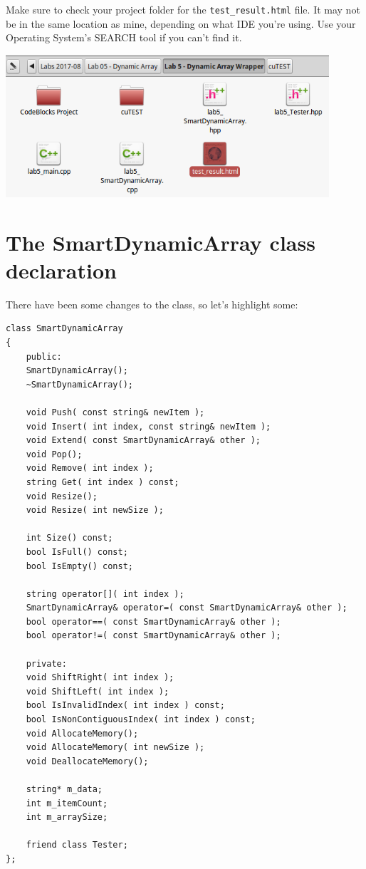\documentclass[a4paper,12pt]{book}
\begin{document}
        Make sure to check your project folder for the \texttt{test\_result.html} file.
        It may not be in the same location as mine, depending on what IDE you're using.
        Use your Operating System's SEARCH tool if you can't find it.

        \begin{center}
            \includegraphics[width=12cm]{images/lab5-fileoutput.png}
        \end{center}



    \newpage
    \section*{The SmartDynamicArray class declaration}

        There have been some changes to the class, so let's highlight some:

\begin{lstlisting}[style=code]
class SmartDynamicArray
{
    public:
    SmartDynamicArray();
    ~SmartDynamicArray();

    void Push( const string& newItem );
    void Insert( int index, const string& newItem );
    void Extend( const SmartDynamicArray& other );
    void Pop();
    void Remove( int index );
    string Get( int index ) const;
    void Resize();
    void Resize( int newSize );

    int Size() const;
    bool IsFull() const;
    bool IsEmpty() const;

    string operator[]( int index );
    SmartDynamicArray& operator=( const SmartDynamicArray& other );
    bool operator==( const SmartDynamicArray& other );
    bool operator!=( const SmartDynamicArray& other );

    private:
    void ShiftRight( int index );
    void ShiftLeft( int index );
    bool IsInvalidIndex( int index ) const;
    bool IsNonContiguousIndex( int index ) const;
    void AllocateMemory();
    void AllocateMemory( int newSize );
    void DeallocateMemory();

    string* m_data;
    int m_itemCount;
    int m_arraySize;

    friend class Tester;
};
\end{lstlisting}
\end{document}
